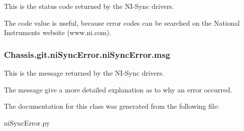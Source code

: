 This is the status code returned by the N\-I-\/\-Sync drivers. 

The code value is useful, because error codes can be searched on the National Instruments website (www.\-ni.\-com). \hypertarget{class_chassis_8git_1_1ni_sync_error_1_1ni_sync_error_a54b1ff4a75afb1922957a748709bdcde}{
\subsubsection[{msg}]{\setlength{\rightskip}{0pt plus 5cm}Chassis.\-git.\-ni\-Sync\-Error.\-ni\-Sync\-Error.\-msg}}\label{class_chassis_8git_1_1ni_sync_error_1_1ni_sync_error_a54b1ff4a75afb1922957a748709bdcde}


This is the message returned by the N\-I-\/\-Sync drivers. 

The message give a more detailed explanation as to why an error occurred. 

The documentation for this class was generated from the following file\-:\begin{DoxyCompactItemize}
\item 
ni\-Sync\-Error.\-py\end{DoxyCompactItemize}
